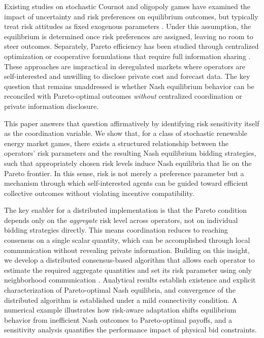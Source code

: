 \documentclass[conference]{IEEEtran}
\begin{document}
Existing studies on stochastic Cournot and oligopoly games have examined the impact of uncertainty and risk preferences on equilibrium outcomes,
but typically treat risk attitudes as fixed exogenous parameters \cite{cheng2002bertrand, sakai1989risk, gulpinar2014analysis}.
Under this assumption, the equilibrium is determined once risk preferences are assigned, leaving no room to steer outcomes.
Separately, Pareto efficiency has been studied through centralized optimization or cooperative formulations that require full information sharing
\cite{hobbs2001individual, zhao2010social, su2018integrated}.
These approaches are impractical in deregulated markets where operators are self-interested and unwilling to disclose private cost and forecast data.
The key question that remains unaddressed is whether Nash equilibrium behavior can be reconciled with Pareto-optimal outcomes
\emph{without} centralized coordination or private information disclosure.

This paper answers that question affirmatively by identifying risk sensitivity itself as the coordination variable.
We show that, for a class of stochastic renewable energy market games, there exists a structured relationship between the operators'
risk parameters and the resulting Nash equilibrium bidding strategies, such that appropriately chosen risk levels induce Nash equilibria
that lie on the Pareto frontier.
In this sense, risk is not merely a preference parameter but a mechanism through which self-interested agents can be guided
toward efficient collective outcomes without violating incentive compatibility.

The key enabler for a distributed implementation is that the Pareto condition depends only on the \emph{aggregate} risk level
across operators, not on individual bidding strategies directly.
This means coordination reduces to reaching consensus on a single scalar quantity,
which can be accomplished through local communication without revealing private information.
Building on this insight, we develop a distributed consensus-based algorithm that allows each operator to estimate the required
aggregate quantities and set its risk parameter using only neighborhood communication \cite{molzahn2017survey, yang2019survey}.
Analytical results establish existence and explicit characterization of Pareto-optimal Nash equilibria,
and convergence of the distributed algorithm is established under a mild connectivity condition.
A numerical example illustrates how risk-aware adaptation shifts equilibrium behavior from inefficient Nash outcomes to Pareto-optimal payoffs,
and a sensitivity analysis quantifies the performance impact of physical bid constraints.
\end{document}

